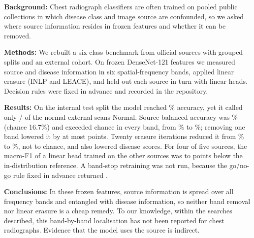 \noindent\textbf{Background:} Chest radiograph classifiers are often trained on pooled public collections in which disease class and image source are confounded, so we asked where source information resides in frozen features and whether it can be removed.

\noindent\textbf{Methods:} We rebuilt a six-class benchmark from official sources with grouped splits and an external cohort. On frozen DenseNet-121 features we measured source and disease information in six spatial-frequency bands, applied linear erasure (INLP and LEACE), and held out each source in turn with linear heads. Decision rules were fixed in advance and recorded in the repository.

\noindent\textbf{Results:} On the internal test split the model reached \RTestAcc\% accuracy, yet it called only \RExtSpecK/\RExtSpecN{} of the normal external scans Normal. Source balanced accuracy was \RSpecMainTestFullSrcBA\% (chance 16.7\%) and exceeded chance in every band, from \RSpecMainTestPassASrcBA\% to \RSpecMainTestPassFSrcBA\%; removing one band lowered it by at most \RSpecMainTestStopFDeltaS{} points. Twenty erasure iterations reduced it from \RInlpImgTestSrcBAKZero\% to \RInlpImgTestSrcBAKStar\%, not to chance, and also lowered disease scores. For four of five sources, the macro-F1 of a linear head trained on the other sources was \RLosoImgCohenGap{} to \RLosoImgTBXkGap{} points below the in-distribution reference. A band-stop retraining was not run, because the go/no-go rule fixed in advance returned \RBsDecision.

\noindent\textbf{Conclusions:} In these frozen features, source information is spread over all frequency bands and entangled with disease information, so neither band removal nor linear erasure is a cheap remedy. To our knowledge, within the searches described, this band-by-band localisation has not been reported for chest radiographs. Evidence that the model uses the source is indirect.
